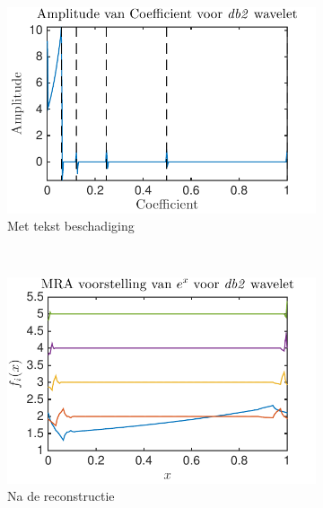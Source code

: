\begin{figure}
\begin{subfigure}[b]{0.45\textwidth}
        \includegraphics[width=\textwidth]{../src/denoising/db2_noNoise/coef_exp_db2_4}
        \caption{Met tekst beschadiging}
        \label{fig:tiger}
    \end{subfigure}
    ~ %
    \begin{subfigure}[b]{0.45\textwidth}
        \includegraphics[width=\textwidth]{../src/denoising/db2_noNoise/MRA_exp_db2_4}
        \caption{Na de reconstructie}
        \label{fig:mouse}
    \end{subfigure}
    \begin{subfigure}[b]{0.45\textwidth}

\end{subfigure}
\end{figure}
